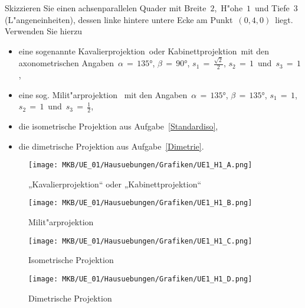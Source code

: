 \small
\begin{Aufgabe}
Skizzieren Sie einen achsenparallelen Quader mit Breite \,$2$,\, H"ohe \,$1$\, und Tiefe \,$3$\, (L"angeneinheiten), dessen linke hintere untere Ecke am Punkt \,$(0,4,0)$\, liegt. Verwenden Sie hierzu
    \begin{itemize}
    \item eine sogenannte \glqq Kavalierprojektion\grqq\ oder \glqq Kabinettprojektion\grqq\ mit den axonometrischen Angaben \,$\alpha \,=\, \ang{135}$,\; $\beta \,= \,\ang{90}$,\; $s_1 \,=\, \tfrac{\sqrt{2}}{2}$,\; $s_2 \,=\, 1$\, und\, $s_3\,=\, 1$,
     \item eine sog. \glqq Milit"arprojektion \grqq\ mit den Angaben \,$\alpha\,= \,\ang{135}$, \;$\beta\,=\, \ang{135}$,\; $s_1 \,= \,1$,\, $s_2 \,=\, 1$\, und\, $s_3 \,=\, \tfrac{1}{2}$,
     \item die isometrische Projektion aus Aufgabe~\ref{Standardiso},
     \item die dimetrische Projektion aus Aufgabe~\ref{Dimetrie}.
\end{itemize}
\end{Aufgabe}
\begin{Loesung}

\begin{figure}[H]
	\centering
	\texttt{[image: MKB/UE\_01/Hausuebungen/Grafiken/UE1\_H1\_A.png]}
	\caption{ „Kavalierprojektion“ oder „Kabinettprojektion“}
	\label{fig:H1_A}
\end{figure}

\begin{figure}[H]
	\centering
	\texttt{[image: MKB/UE\_01/Hausuebungen/Grafiken/UE1\_H1\_B.png]}
	\caption{ Milit"arprojektion}
	\label{fig:H1_B}
\end{figure}

\begin{figure}[H]
	\centering
	\texttt{[image: MKB/UE\_01/Hausuebungen/Grafiken/UE1\_H1\_C.png]}
	\caption{ Isometrische Projektion}
	\label{fig:H1_C}
\end{figure}

\begin{figure}[H]
	\centering
	\texttt{[image: MKB/UE\_01/Hausuebungen/Grafiken/UE1\_H1\_D.png]}
	\caption{ Dimetrische Projektion}
	\label{fig:H1_D}
\end{figure}
\end{Loesung}
